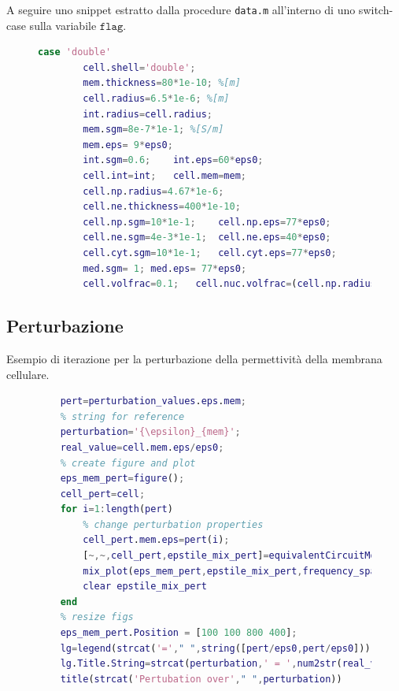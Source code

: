 A seguire uno snippet estratto dalla procedure \texttt{data.m} all'interno di uno switch-case sulla variabile $\mathtt{flag}$.

\begin{figure}[h!]
	\begin{lstlisting}[language=matlab]
	case 'double'
		cell.shell='double';
		mem.thickness=80*1e-10; %[m]
		cell.radius=6.5*1e-6; %[m]
		int.radius=cell.radius;
		mem.sgm=8e-7*1e-1; %[S/m]
		mem.eps= 9*eps0; 
		int.sgm=0.6; 	int.eps=60*eps0;
		cell.int=int;	cell.mem=mem;
		cell.np.radius=4.67*1e-6;
		cell.ne.thickness=400*1e-10;
		cell.np.sgm=10*1e-1; 	cell.np.eps=77*eps0;
		cell.ne.sgm=4e-3*1e-1;	cell.ne.eps=40*eps0;
		cell.cyt.sgm=10*1e-1;	cell.cyt.eps=77*eps0;
		med.sgm= 1;	med.eps= 77*eps0;
		cell.volfrac=0.1; 	cell.nuc.volfrac=(cell.np.radius/cell.radius)^3;
	\end{lstlisting}
\end{figure}

\subsection*{Perturbazione}

Esempio di iterazione per la perturbazione della permettività della membrana cellulare.

\begin{figure}[h!]
	\begin{lstlisting}[language=matlab]
	% load pertubation values 
	pert=perturbation_values.eps.mem;
	% string for reference
	perturbation='{\epsilon}_{mem}'; 
	real_value=cell.mem.eps/eps0;
	% create figure and plot
	eps_mem_pert=figure();
	cell_pert=cell;
	for i=1:length(pert)
		% change perturbation properties
		cell_pert.mem.eps=pert(i);
		[~,~,cell_pert,epstile_mix_pert]=equivalentCircuitModel(med,cell_pert,frequency_span);
		mix_plot(eps_mem_pert,epstile_mix_pert,frequency_span,omega,{colorType1{i},colorType2{i}})
		clear epstile_mix_pert
	end
	% resize figs
	eps_mem_pert.Position = [100 100 800 400];
	lg=legend(strcat('='," ",string([pert/eps0,pert/eps0])),'Location','eastoutside');
	lg.Title.String=strcat(perturbation,' = ',num2str(real_value),' [S/m]');
	title(strcat('Pertubation over'," ",perturbation))
	\end{lstlisting}
\end{figure}
